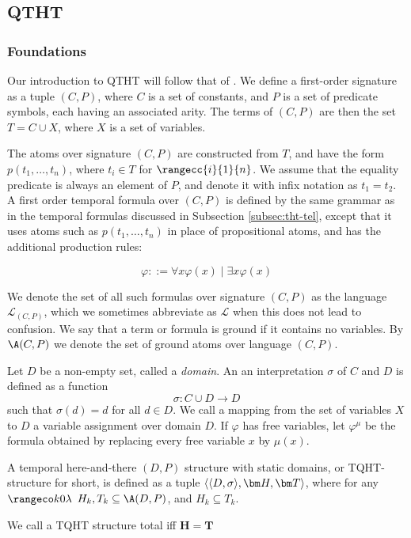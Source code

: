 \subsection{QTHT}

\subsubsection{Foundations}

Our introduction to QTHT will follow that of \cite{agcapevidi17a}. We
define a first-order signature as a tuple $(C,P)$, where $C$ is a set
of constants, and $P$ is a set of predicate symbols, each having an
associated arity. The terms of $(C,P)$ are then the set
$T = C \cup X$, where $X$ is a set of variables.

The atoms over signature $(C,P)$ are constructed from $T$, and have
the form $p(t_1,\dots,t_n)$, where $t_i \in T$ for
$\rangecc{i}{1}{n}$. We assume that the equality predicate is always
an element of $P$, and denote it with infix notation as $t_1=t_2$. A
first order temporal formula over $(C,P)$ is defined by the same
grammar as in the temporal formulas discussed in Subsection
\ref{subsec:tht-tel}, except that it uses atoms such as
$p(t_1, \dots, t_n)$ in place of propositional atoms, and has the
additional production rules:

$$
\varphi ::= \forall x \varphi(x) \mid \exists x \varphi(x)
$$

We denote the set of all such formulas over signature $(C,P)$ as the
language $\mathcal{L}_{(C,P)}$, which we sometimes abbreviate as
$\mathcal{L}$ when this does not lead to confusion. We say that a term
or formula is ground if it contains no variables. By $\A(C,P)$ we
denote the set of ground atoms over language $(C,P)$.

Let $D$ be a non-empty set, called a \emph{domain}. An an
interpretation $\sigma$ of $C$ and $D$ is defined as a function
$$
\sigma: C \cup D \rightarrow D
$$
such that $\sigma(d) = d$ for all $d \in D$. We call a mapping from
the set of variables $X$ to $D$ a variable assignment over domain
$D$. If $\varphi$ has free variables, let $\varphi^\mu$ be the formula
obtained by replacing every free variable $x$ by $\mu(x)$.

\begin{definition}
  A temporal here-and-there $(D,P)$ structure with static domains, or
  TQHT-structure for short, is defined as a tuple $\qthandt$, where
  for any $\kinlambda$ $H_k,T_k \subseteq \A(D,P)$, and
  $H_k \subseteq T_k$.

  We call a TQHT structure total iff $\bm{H}=\bm{T}$
\end{definition}


